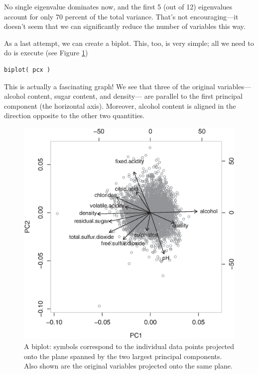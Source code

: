 No single eigenvalue dominates now, and the first 5 (out of 12)
eigenvalues account for only 70 percent of the total variance.  That's
not encouraging---it doesn't seem that we can significantly reduce the
number of variables this way.

As a last attempt, we can create a biplot.  This, too, is very
simple; all we need to do is execute (see Figure \ref{fig:biplot})

\begin{verbatim}
biplot( pcx )
\end{verbatim}\vspace*{-4pt}

This is actually a fascinating graph! We see that three of the
original variables---alcohol content, sugar content, and density---
are parallel to the first principal component (the horizontal axis).
Moreover, alcohol content is aligned in the direction opposite to the
other two quantities.

\begin{figure}
  \centerline{\includegraphics[width=\textwidth]{img/biplot}}
  \caption{A biplot: symbols correspond to the individual data points
    projected onto the plane spanned by the two largest principal
    components. Also shown are the original variables projected onto
    the same plane.}
  \label{fig:biplot}
\end{figure}

